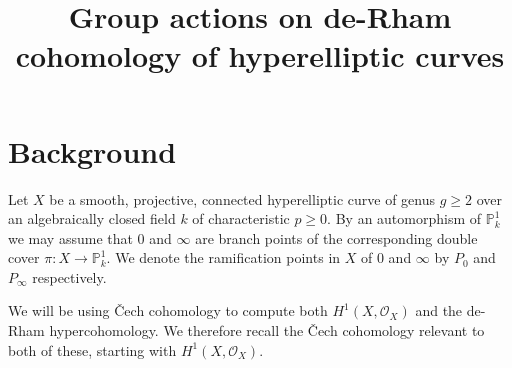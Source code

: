 \documentclass[draft, 11pt]{article} %
\title{Group actions on de-Rham cohomology of hyperelliptic curves}
\author{}
\theoremstyle{plain}
\theoremstyle{remark}
\newcommand{\cech}{\v{C}ech }
\newcommand{\hone}{H^1(X,\mathcal{O}_X)}
\begin{document}
\maketitle

\section{Background}


Let $X$ be a smooth, projective, connected hyperelliptic curve of genus $g \geq 2$ over an algebraically closed field $k$ of characteristic $p \geq 0$.
By an automorphism of $ \mathbb P_k^1$ we may assume that 0 and $\infty$ are branch points of the corresponding double cover $\pi : X \rightarrow \mathbb P_k^1$.
We denote the ramification points in $X$ of 0 and $\infty$ by $P_0$ and $P_\infty$ respectively.

We will be using \cech cohomology to compute both $\hone$ and the de-Rham hypercohomology.
We therefore recall the \cech cohomology relevant to both of these, starting with $\hone$.
\end{document}
